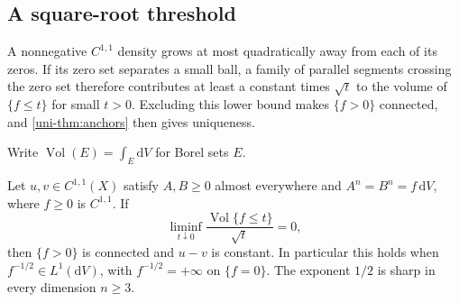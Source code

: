 \subsection{A square-root threshold}
\label{uni-sec:threshold}

A nonnegative $C^{1,1}$ density grows at most quadratically away from each of its zeros. If its zero set separates a small ball, a family of parallel segments crossing the zero set therefore contributes at least a constant times $\sqrt t$ to the volume of $\{f\leq t\}$ for small $t>0$. Excluding this lower bound makes $\{f>0\}$ connected, and \cref{uni-thm:anchors} then gives uniqueness.

Write $\operatorname{Vol}(E)=\int_E\mathrm{d}V$ for Borel sets $E$.

\begin{theorem}\label{uni-thm:threshold}
Let $u,v\in C^{1,1}(X)$ satisfy $A,B\geq0$ almost everywhere and
$A^n=B^n=f\,\mathrm{d}V$, where $f\geq0$ is $C^{1,1}$.  If
\begin{equation}
  \liminf_{t\downarrow0}
  \frac{\operatorname{Vol}\{f\leq t\}}{\sqrt t}=0,
  \label{uni-eq:sqrtcriterion}
\end{equation}
then $\{f>0\}$ is connected and $u-v$ is constant.  In particular this
holds when $f^{-1/2}\in L^1(\mathrm{d}V)$, with $f^{-1/2}=+\infty$ on $\{f=0\}$.
The exponent $1/2$ is sharp in every dimension $n\geq3$.
\end{theorem}

